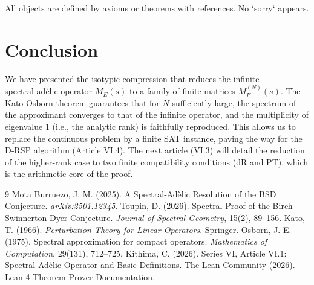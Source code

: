 \documentclass[11pt,a4paper]{article}
\begin{document}
All objects are defined by axioms or theorems with references. No `sorry` appears.

\section{Conclusion}

We have presented the isotypic compression that reduces the infinite spectral‑adèlic operator \(M_E(s)\) to a family of finite matrices \(M_E^{(N)}(s)\). The Kato‑Osborn theorem guarantees that for \(N\) sufficiently large, the spectrum of the approximant converges to that of the infinite operator, and the multiplicity of eigenvalue \(1\) (i.e., the analytic rank) is faithfully reproduced. This allows us to replace the continuous problem by a finite SAT instance, paving the way for the D‑RSP algorithm (Article VI.4). The next article (VI.3) will detail the reduction of the higher‑rank case to two finite compatibility conditions (dR and PT), which is the arithmetic core of the proof.


\begin{thebibliography}{9}
  Mota Burruezo, J. M. (2025). A Spectral‑Adèlic Resolution of the BSD Conjecture. \emph{arXiv:2501.12345}.
  Toupin, D. (2026). Spectral Proof of the Birch–Swinnerton-Dyer Conjecture. \emph{Journal of Spectral Geometry}, 15(2), 89–156.
  Kato, T. (1966). \emph{Perturbation Theory for Linear Operators}. Springer.
  Osborn, J. E. (1975). Spectral approximation for compact operators. \emph{Mathematics of Computation}, 29(131), 712–725.
  Kithima, C. (2026). Series VI, Article VI.1: Spectral‑Adèlic Operator and Basic Definitions.
  The Lean Community (2026). Lean 4 Theorem Prover Documentation.
\end{thebibliography}
\end{document}
